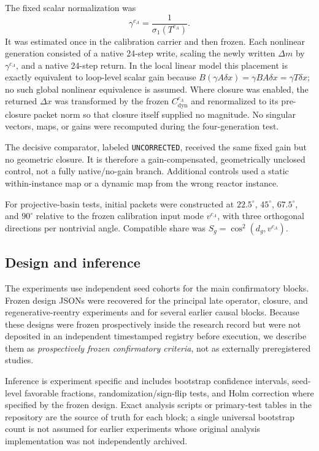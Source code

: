 \documentclass[aps,pre,preprint,superscriptaddress,nofootinbib]{revtex4-2}
\newcommand{\Cdyn}{C_{\mathrm{dyn}}}
\begin{document}
The fixed scalar normalization was
\begin{equation}
 \gamma^{c_A}=\frac{1}{\sigma_1(T^{c_A})}.
\end{equation}
It was estimated once in the calibration carrier and then frozen. Each nonlinear generation consisted of a native 24-step write, scaling the newly written $\Delta m$ by $\gamma^{c_A}$, and a native 24-step return. In the local linear model this placement is exactly equivalent to loop-level scalar gain because $B(\gamma A\delta x)=\gamma BA\delta x=\gamma T\delta x$; no such global nonlinear equivalence is assumed. Where closure was enabled, the returned $\Delta x$ was transformed by the frozen $\Cdyn^{c_A}$ and renormalized to its pre-closure packet norm so that closure itself supplied no magnitude. No singular vectors, maps, or gains were recomputed during the four-generation test.

The decisive comparator, labeled \texttt{UNCORRECTED}, received the same fixed gain but no geometric closure. It is therefore a gain-compensated, geometrically unclosed control, not a fully native/no-gain branch. Additional controls used a static within-instance map or a dynamic map from the wrong reactor instance.

For projective-basin tests, initial packets were constructed at $22.5^\circ$, $45^\circ$, $67.5^\circ$, and $90^\circ$ relative to the frozen calibration input mode $v^{c_A}$, with three orthogonal directions per nontrivial angle. Compatible share was $S_g=\cos^2(d_g,v^{c_A})$.

\subsection{Design and inference}

The experiments use independent seed cohorts for the main confirmatory blocks. Frozen design JSONs were recovered for the principal late operator, closure, and regenerative-reentry experiments and for several earlier causal blocks. Because these designs were frozen prospectively inside the research record but were not deposited in an independent timestamped registry before execution, we describe them as \emph{prospectively frozen confirmatory criteria}, not as externally preregistered studies.

Inference is experiment specific and includes bootstrap confidence intervals, seed-level favorable fractions, randomization/sign-flip tests, and Holm correction where specified by the frozen design. Exact analysis scripts or primary-test tables in the repository are the source of truth for each block; a single universal bootstrap count is not assumed for earlier experiments whose original analysis implementation was not independently archived.
\end{document}
